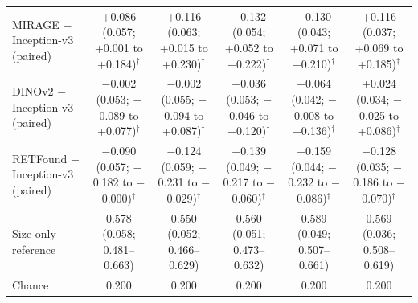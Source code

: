 \begin{tabular}{@{}lccccc@{}}
\midrule
\makecell[l]{MIRAGE $-$\\Inception-v3 (paired)} & \makecell{+0.086\\{\scriptsize (0.057; +0.001 to +0.184)$^\dagger$}} & \makecell{+0.116\\{\scriptsize (0.063; +0.015 to +0.230)$^\dagger$}} & \makecell{+0.132\\{\scriptsize (0.054; +0.052 to +0.222)$^\dagger$}} & \makecell{+0.130\\{\scriptsize (0.043; +0.071 to +0.210)$^\dagger$}} & \makecell{+0.116\\{\scriptsize (0.037; +0.069 to +0.185)$^\dagger$}} \\
\makecell[l]{DINOv2 $-$\\Inception-v3 (paired)} & \makecell{$-$0.002\\{\scriptsize (0.053; $-$0.089 to +0.077)$^\dagger$}} & \makecell{$-$0.002\\{\scriptsize (0.055; $-$0.094 to +0.087)$^\dagger$}} & \makecell{+0.036\\{\scriptsize (0.053; $-$0.046 to +0.120)$^\dagger$}} & \makecell{+0.064\\{\scriptsize (0.042; $-$0.008 to +0.136)$^\dagger$}} & \makecell{+0.024\\{\scriptsize (0.034; $-$0.025 to +0.086)$^\dagger$}} \\
\makecell[l]{RETFound $-$\\Inception-v3 (paired)} & \makecell{$-$0.090\\{\scriptsize (0.057; $-$0.182 to $-$0.000)$^\dagger$}} & \makecell{$-$0.124\\{\scriptsize (0.059; $-$0.231 to $-$0.029)$^\dagger$}} & \makecell{$-$0.139\\{\scriptsize (0.049; $-$0.217 to $-$0.060)$^\dagger$}} & \makecell{$-$0.159\\{\scriptsize (0.044; $-$0.232 to $-$0.086)$^\dagger$}} & \makecell{$-$0.128\\{\scriptsize (0.035; $-$0.186 to $-$0.070)$^\dagger$}} \\
\midrule
Size-only reference & \makecell{0.578\\{\scriptsize (0.058; 0.481--0.663)}} & \makecell{0.550\\{\scriptsize (0.052; 0.466--0.629)}} & \makecell{0.560\\{\scriptsize (0.051; 0.473--0.632)}} & \makecell{0.589\\{\scriptsize (0.049; 0.507--0.661)}} & \makecell{0.569\\{\scriptsize (0.036; 0.508--0.619)}} \\
Chance & 0.200 & 0.200 & 0.200 & 0.200 & 0.200 \\
\bottomrule
\end{tabular}

